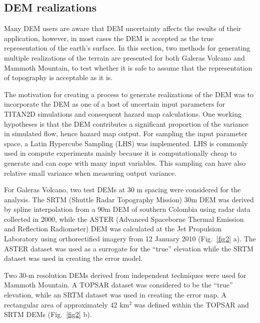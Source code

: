 \documentclass[12pt]{article}
\begin{document}

\subsection{DEM realizations}

Many DEM users are aware that DEM uncertainty affects the results of
their application, however, in most cases the DEM is accepted as the
true representation of the earth's surface. In this section, two
methods for generating multiple realizations of the terrain are
presented for both Galeras Volcano and Mammoth Mountain, to test
whether it is safe to assume that the representation of topography is
acceptable as it is.

The motivation for creating a process to generate realizations of the DEM was
to incorporate the DEM as one of a host of uncertain input parameters for TITAN2D
simulations and consequent hazard map calculations.  One working hypotheses is that the
DEM contributes a significant proportion of the variance in simulated
flow, hence hazard map output.  For sampling the input parameter
space, a Latin Hypercube Sampling (LHS) was implemented. LHS is
commonly used in compute experiments \citep{McKay1979, Sacks1989} mainly because
it is computationally cheap to generate and can cope with many input
variables. This sampling can have also relative small variance when
measuring output variance. %

For Galeras Volcano, two test DEMs at 30 m spacing were considered for
the analysis. The SRTM (Shuttle Radar Topography Mission) 30m DEM was
derived by spline interpolation from a 90m DEM of southern Colombia
using radar data collected in 2000, while the ASTER (Advanced
Spaceborne Thermal Emission and Reflection Radiometer) DEM was
calculated at the Jet Propulsion Laboratory using orthorectified
imagery from 12 January 2010 (Fig.~\ref{fig2} a).  The ASTER dataset
was used as a surrogate for the ``true'' elevation while the SRTM
dataset was used in creating the error model.


Two 30-m resolution DEMs derived from independent techniques were used
for Mammoth Mountain.  A TOPSAR dataset was considered to be the
``true'' elevation, while an SRTM dataset was used in creating the
error map.  A rectangular area of approximately 42 km$^2$ was
defined within the TOPSAR and SRTM DEMs (Fig.~\ref{fig2} b).
\end{document}
